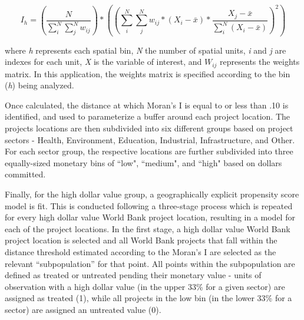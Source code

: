 \documentclass[sustainability,article,submit,moreauthors,pdftex,10pt,a4paper]{mdpi}
\begin{document}
\begin{equation}
I_h = (\frac{N}{\sum_{i}^{N}\sum_{j}^{N}w_{ij}}) * ((\sum_{i}^{N}\sum_{j}^{N}w_{ij} * (X_{i}-\bar{x}) * \frac{X_{j} - \bar{x}}{\sum_{i}^{N}(X_{i}-\bar{x})})^{2})
\label{EQmoran}
\end{equation}

where \textit{h} represents each spatial bin, \textit{N} the number of spatial units, \textit{i} and \textit{j} are indexes for each unit, \textit{X} is the variable of interest, and \begin{math}W_{ij}\end{math} represents the weights matrix. In this application, the weights matrix is specified according to the bin (\textit{h}) being analyzed.  
\par
Once calculated, the distance at which Moran's I is equal to or less than .10 is identified, and used to parameterize a buffer around each project location. The projects locations are then subdivided into six different groups based on project sectors - Health, Environment, Education, Industrial, Infrastructure, and Other. For each sector group, the respective locations are further subdivided into three equally-sized monetary bins of ``low", ``medium", and ``high" based on dollars committed.
\par
Finally, for the high dollar value group, a geographically explicit propensity score model is fit. This is conducted following a three-stage process which is repeated for every high dollar value World Bank project location, resulting in a model for each of the project locations. In the first stage, a high dollar value World Bank project location is selected and all World Bank projects that fall within the distance threshold estimated according to the Moran's I are selected as the relevant ``subpopulation'' for that point. All points within the subpopulation are defined as treated or untreated pending their monetary value - units of observation with a high dollar value (in the upper 33\% for a given sector) are assigned as treated (1), while all projects in the  low bin (in the lower 33\% for a sector) are assigned an untreated value (0).
\par
\end{document}
